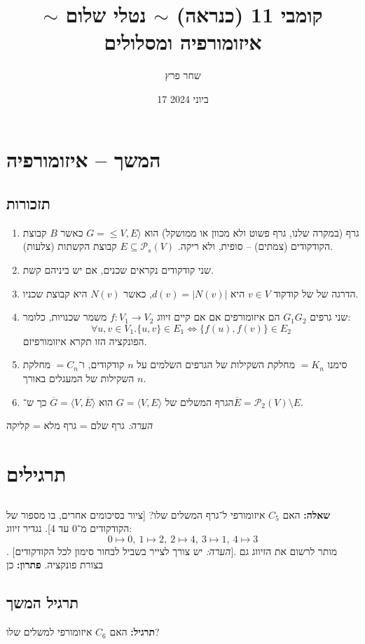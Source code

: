 \documentclass[]{article}
\author{שחר פרץ}
\title{קומבי 11 (כנראה) $\sim$ נטלי שלום $\sim$ איזומורפיה ומסלולים}
\date{17 ביוני 2024}
\newcommand\ps    {\mathcal{P}}
\newcommand\ra    {\rangle}
\newcommand\la    {\langle}
\newcommand\ol    {\overline}
\newcommand\mto       {\mapsto}
\newcommand\sof[1]    {\left | #1 \right |}
\begin{document}
	\maketitle
	\section{המשך – איזומורפיה}
	\subsection{תזכורות}
	\begin{enumerate}
		\item גרף (במקרה שלנו, גרף פשוט ולא מכוון או ממושקל) הוא $G = \le V, E \ra$ כאשר $B$ קבוצת הקודקודים (צמתים) – סופית, ולא ריקה. $E \subseteq \ps_s (V)$ קבוצת הקשתות (צלעות). 
		\item שני קודקודים נקראים שכנים, אם יש ביניהם קשת. 
		\item הדרגה של של קודקוד $v \in V$ היא $d(v) = \sof{N(v)}$, כאשר $N(v)$ היא קבוצת שכניו. 
		\item שני גרפים $G_1 G_2$ הם איזומורפים אם אם קיים זיווג $f \colon V_1 \to V_2$ משמר שכנויות, כלומר: 
		\[ \forall u, v \in V_1. \{u, v\}\in E_1 \iff \{f(u), f(v)\} \in E_2 \]
		הפונקציה הזו תקרא איזומורפיזם. 
		\item סימנו $=K_n$ מחלקת השקילות של הגרפים השלמים על $n$ קודקודים, ו־$=C_n$ מחלקת השקילות של המעגלים באורך $n$. 
		\item הגרף המשלים של $G = \la V, E \ra$ הוא $\ol G = \la V, \ol E \ra $ כך ש־$\ol E = \ps_2(V) \setminus E$.
	\end{enumerate}
	\textit{הערה: }גרף שלם = גרף מלא = קליקה
	\section{תרגילים}
	\subsection{}
	\textbf{שאלה: }האם $C_5$  איזומורפי ל־גרף המשלים שלו? [ציור בסיכומים אחרים, בו מספור של הקודקודים מ־0 עד 4]. נגדיר זיווג: 
	\[ 0 \mapsto 0, \ 1 \mapsto 2, \ 2 \mto 4, \ 3 \mto 1, \ 4 \mto 3 \]. 
	[\textit{הערה: }יש צורך לצייר בשביל לבחור סימון לכל הקודקודים]. 
	מותר לרשום את הזיווג גם בצורת פונקציה. \textbf{פתרון: }כן
	\subsection{תרגיל המשך}
	\textbf{תרגיל: }האם $C_6$ איזומורפי למשלים שלו?
	
\end{document}
